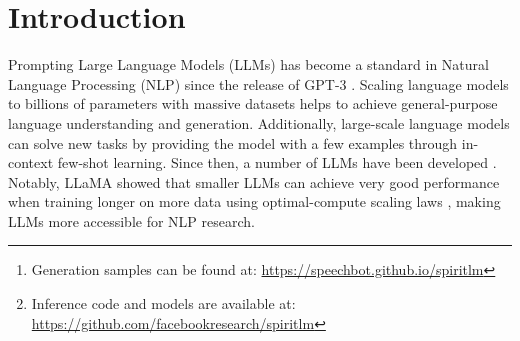 \title{}



\maketitle
\begin{abstract}

    
     We introduce \spot{}, a  foundation multimodal language model that freely mixes text and speech. %
     Our model is based on a 7B pretrained text language model that we extend to the speech modality by continuously training it on text and speech units. Speech and text sequences are concatenated as a single stream of tokens, and trained with a word-level \textit{interleaving} method using a small automatically-curated speech-text parallel corpus. 
     \spot comes in two versions: a \textsc{Base} version that uses speech phonetic units (HuBERT) and an \textsc{Expressive} version that models expressivity using pitch and style units in addition to the phonetic units. For both versions, the text is encoded with subword BPE tokens.  The resulting model displays both the semantic abilities of text models and the expressive abilities of speech models. Additionally, we demonstrate that \spot{} can learn new tasks in a few-shot fashion across modalities (i.e. ASR, TTS, Speech Classification). 
     We make available model weights and inference code
     \footnote{\label{demopage}Generation samples can be found at: \url{https://speechbot.github.io/spiritlm} 
     }\footnote{\label{githubpage}Inference code and models are available at: \url{https://github.com/facebookresearch/spiritlm}}
     .

   

\end{abstract}
\vspace{-1.5em}
\section{Introduction}\label{sec:intro}
\vspace{-0.5em}
Prompting Large Language Models (LLMs) has become a standard in Natural Language Processing (NLP) since the release of GPT-3 \citep{brown2020gpt3}. %
Scaling language models to billions of parameters with massive datasets helps to achieve general-purpose language understanding and generation. Additionally, large-scale language models can solve new tasks by providing the model with a few examples through in-context few-shot learning.
Since then, a number of LLMs have been developed \cite{chowdhery2022palm, hoffmann2022training, zhang2022opt, touvron2023llama}.
Notably, LLaMA \citep{touvron2023llama} showed that smaller LLMs can achieve very good performance when training longer on more data using optimal-compute scaling laws \cite{kaplan2020scaling}, making LLMs more accessible for NLP research.

